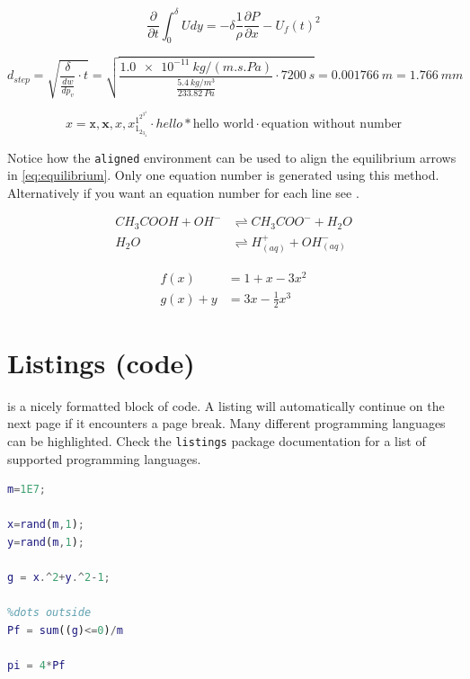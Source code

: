 \begin{equation} \label{eq:IME}
    \frac{\partial}{\partial t} \int_{0}^{\delta} U dy = - \delta \frac{1}{\rho}\frac{\partial P}{\partial x}-U_f(t)^2
\end{equation}

\begin{equation} \label{eq:penDepthStep}
d_{step} = \sqrt{\frac{\delta}{\frac{dw}{dp_v}} \cdot t} =
\sqrt{\frac{\SI{1.0e-11}{kg/(m.s.Pa)}}{\frac{\SI{5.4}{kg/m^3}}{\SI{233.82}{Pa}}} \cdot \SI{7200}{s}} =
\SI{0.001766}{m} = \SI{1.766}{mm}
\end{equation}

\begin{equation*} %
    x = \mathtt{x}, \mathbf{x}, \mathit{x}, x_{1_{2_{3_{4}}}}^{1^{2^{3^{4}}}} \cdot hello * \text{hello world} \cdot \text{equation without number}
\end{equation*}

Notice how the \texttt{aligned} environment can be used to align the equilibrium arrows in \cref{eq:equilibrium}. Only one equation number is generated using this method. Alternatively if you want an equation number for each line see .

\begin{equation} \label{eq:equilibrium}
\begin{aligned}
    CH_3COOH + OH^{-} &\rightleftharpoons CH_3COO^{-} + H_2O \\
    H_2O &\rightleftharpoons H^{+}_{(aq)} + OH^{-}_{(aq)}
\end{aligned}
\end{equation}


\begin{align}
    \label{eq:align1}
    f(x) &= 1 + x - 3 x^2 \\
    \label{eq:align2}
    g(x) + y &= 3x - \frac{1}{2} x^3
\end{align}




\section{Listings (code)}

 is a nicely formatted block of code. A listing will automatically continue on the next page if it encounters a page break. Many different programming languages can be highlighted. Check the \texttt{listings} package documentation for a list of supported programming languages.

\begin{lstlisting}[language=Matlab, caption = Monte Carlo simulation to estimate the value of $\pi$, label=lst:montecarlo]
%% Monte Carlo simulation, estimation of pi
m=1E7;

x=rand(m,1);
y=rand(m,1);

g = x.^2+y.^2-1;

%dots outside
Pf = sum((g)<=0)/m

pi = 4*Pf
\end{lstlisting}

